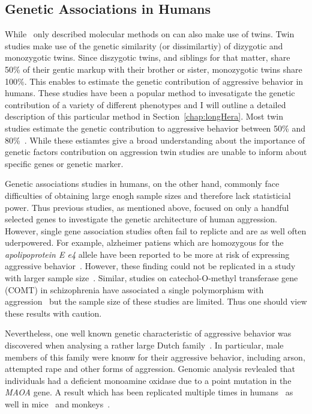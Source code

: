 \subsection{Genetic Associations in Humans}
\label{sub:genetic_associations_in_humans}
While~\citet{Maxson2005} only described molecular methods on can also make use of twins.
Twin studies make use of the genetic similarity (or dissimilartiy) of dizygotic and monozygotic twins.
Since diszygotic twins, and siblings for that matter, share 50\% of their gentic markup with their brother or sister, monozygotic twins share 100\%.
This enables to estimate the genetic contribution of aggressive behavior in humans.
These studies have been a popular method to invesatigate the genetic contribution of a variety of different phenotypes and I will outline a detailed description of this particular method in Section~\ref{chap:longHera}.
Most twin studies estimate the genetic contribution to aggressive behavior between 50\% and 80\%~\cite{Porsch2016}.
While these estiamtes give a broad understanding about the importance of genetic factors contribution on aggression twin studies are unable to inform about specific genes or genetic marker.

Genetic associations studies in humans, on the other hand, commonly face difficulties of obtaining large enogh sample sizes and therefore lack statisticial power.
Thus previous studies, as mentioned above, focused on only a handful selected genes to investigate the genetic architecture of human aggression.
However, single gene association studies often fail to replicte and are as well often uderpowered.
For example, alzheimer patiens which are homozygous for the \textit{apolipoprotein E e4} allele have been reported to be more at risk of expressing aggressive behavior~\cite{Craig2004a,VanDerFlier2006}.
However, these finding could not be replicated in a study with larger sample size~\cite{Hollingworth2006}.
Similar, studies on catechol-O-methyl transferase gene (COMT) in schizophrenia have associated a single polymorphism with aggression~\cite{Hirata2013,Calati2011} but the sample size of these studies are limited.
Thus one should view these results with caution.

Nevertheless, one well known genetic characteristic of aggressive behavior was discovered when analysing a rather large Dutch family~\cite{Brunner1993}.
In particular, male members of this family were knonw for their aggressive behavior, including arson, attempted rape and other forms of aggression.
Genomic analysis revlealed that individuals had a deficient monoamine oxidase due to a point mutation in the \textit{MAOA} gene.
A result which has been replicated multiple times in humans~\cite{Huang2004,Manuck2000} as well in mice~\cite{Cases1995b} and monkeys~\cite{Newman2005}.

